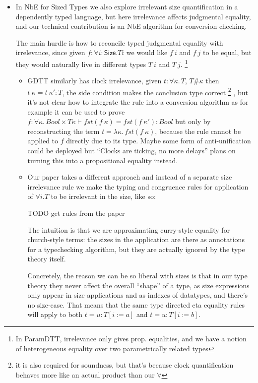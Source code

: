 \documentclass{book}
\newcommand{\sd}{.\,}
\begin{document}
\begin{itemize}
    \item In NbE for Sized Types we also explore irrelevant size
    quantification in a dependently typed language, but here
    irrelevance affects judgmental equality, and our technical
    contribution is an NbE algorithm for conversion checking.

    The main hurdle is how to reconcile typed judgmental equality with
    irrelevance, since given $f : \forall i : \mathsf{Size}. T i$ we would like
    $f~i$ and $f~j$ to be equal, but they would naturally live in
    different types $T~i$ and $T~j$.
    \footnote{In ParamDTT, irrelevance only gives prop. equalities,
      and we have a notion of heterogeneous equality over two
      parametrically related types}
    \begin{itemize}
    \item GDTT similarly has clock irrelevance, given $t : \forall
    \kappa\sd T$, $T \# \kappa$ then $t~\kappa = t~\kappa' : T$, the
    side condition makes the conclusion type correct
    \footnote{it is also required for soundness, but that's because
      clock quantification behaves more like an actual product than
      our $\forall$}
    , but it's not clear how to integrate the rule into a conversion
    algorithm as for example it can be used to prove
    $f : \forall \kappa\sd Bool \times T \kappa \vdash fst (f~\kappa) = fst (f~\kappa') : Bool$
    but only by reconstructing the term $t = \lambda \kappa\sd fst
    (f~\kappa)$, because the rule cannot be applied to $f$ directly
    due to its type.
    Maybe some form of anti-unification could be deployed but ``Clocks
    are ticking, no more delays'' plans on turning this into a
    propositional equality instead.

    \item Our paper takes a different approach and instead of a separate
    size irrelevance rule we make the typing and congruence rules for
    application of $\forall i. T$ to be irrelevant in the size, like so:

      TODO get rules from the paper

   The intuition is that we are approximating curry-style equality for
   church-style terms: the sizes in the application are there as
   annotations for a typechecking algorithm, but they are actually
   ignored by the type theory itself.

   Concretely, the reason we can be so liberal with sizes is that
   in our type theory they never affect the overall ``shape'' of a
   type, as size expressions only appear in size applications and as
   indexes of datatypes, and there's no size-case. That means that the
   same type directed eta equality rules will apply to both $t = u :
   T[i:=a]$ and $t = u : T[i:=b]$.


\end{itemize}
\end{itemize}
\end{document}
